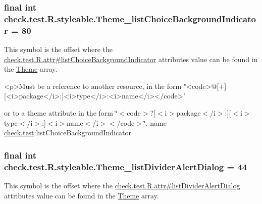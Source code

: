 \subsubsection[{Theme\+\_\+list\+Choice\+Background\+Indicator}]{\setlength{\rightskip}{0pt plus 5cm}final int check.\+test.\+R.\+styleable.\+Theme\+\_\+list\+Choice\+Background\+Indicator = 80\hspace{0.3cm}{\ttfamily [static]}}\label{classcheck_1_1test_1_1_r_1_1styleable_a26daf114808db4e2394c40f88131eb51}
This symbol is the offset where the \hyperlink{classcheck_1_1test_1_1_r_1_1attr_ae62397dfd4fd28583456ecf25a611d85}{check.\+test.\+R.\+attr\#list\+Choice\+Background\+Indicator} attribute\textquotesingle{}s value can be found in the \hyperlink{classcheck_1_1test_1_1_r_1_1styleable_acca726d02016a0cf607782ec3a436a81}{Theme} array.

\begin{DoxyVerb}      <p>Must be a reference to another resource, in the form "<code>@[+][<i>package</i>:]<i>type</i>:<i>name</i></code>"
\end{DoxyVerb}
 or to a theme attribute in the form \char`\"{}$<$code$>$?\mbox{[}$<$i$>$package$<$/i$>$\+:\mbox{]}\mbox{[}$<$i$>$type$<$/i$>$\+:\mbox{]}$<$i$>$name$<$/i$>$$<$/code$>$\char`\"{}.  name \hyperlink{namespacecheck_1_1test}{check.\+test}\+:list\+Choice\+Background\+Indicator \hypertarget{classcheck_1_1test_1_1_r_1_1styleable_ab74d6b5271031da6a2f14e60706211e7}{}
\subsubsection[{Theme\+\_\+list\+Divider\+Alert\+Dialog}]{\setlength{\rightskip}{0pt plus 5cm}final int check.\+test.\+R.\+styleable.\+Theme\+\_\+list\+Divider\+Alert\+Dialog = 44\hspace{0.3cm}{\ttfamily [static]}}\label{classcheck_1_1test_1_1_r_1_1styleable_ab74d6b5271031da6a2f14e60706211e7}
This symbol is the offset where the \hyperlink{classcheck_1_1test_1_1_r_1_1attr_afac1cbbb1b94904e17111d40e56cd3dd}{check.\+test.\+R.\+attr\#list\+Divider\+Alert\+Dialog} attribute\textquotesingle{}s value can be found in the \hyperlink{classcheck_1_1test_1_1_r_1_1styleable_acca726d02016a0cf607782ec3a436a81}{Theme} array.

